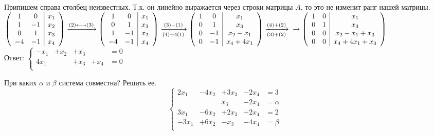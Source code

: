 Припишем справа столбец неизвестных. Т.к. он линейно выражается через строки матрицы $A$, то это не изменит ранг нашей матрицы.\\
$
\left( \begin{array}{cc|c}
1&0&x_1\\
1&-1&x_2\\
0&1&x_3\\
-4&-1&x_4\\
\end{array}\right)
\xrightarrow{(2)\longleftrightarrow(3)}
\left( \begin{array}{cc|c}
1&0&x_1\\
0&1&x_3\\
1&-1&x_2\\
-4&-1&x_4\\
\end{array}\right)
\xrightarrow[(4)+4(1)]{(3)-(1)}
\left( \begin{array}{cc|c}
1&0&x_1\\
0&1&x_3\\
0&-1&x_2-x_1\\
0&-1&x_4+4x_1\\
\end{array}\right)
\xrightarrow[(3)+(2)]{(4)+(2)}\\
\rightarrow
\left( \begin{array}{cc|c}
1&0&x_1\\
0&1&x_3\\
0&0&x_2-x_1+x_3\\
0&0&x_4+4x_1+x_3\\
\end{array}\right)
$\\
Ответ: $\left\{ \begin{array}{rrrrl}
	-x_1&+x_2&+x_3&&=0\\
	4x_1&&+x_3&+x_4&=0\\
\end{array}
\right.$
\begin{prim}
	При каких $\alpha$ и $\beta$ система совместна? Решить ее.
	$$\left\{ \begin{array}{rrrrl}
	2x_1&-4x_2&+3x_3&-2x_4&=3\\
	&&x_3&-2x_4&=\alpha\\
	3x_1&-6x_2&+2x_3&+2x_4&=2\\
	-3x_1&+6x_2&-x_3&-4x_4&=\beta\\
	\end{array}
	\right.$$
\end{prim}

